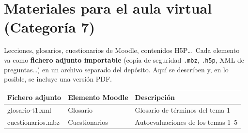 \chapter{Materiales para el aula virtual (Categoría 7)}

\begin{introcategoria}
Lecciones, glosarios, cuestionarios de Moodle, contenidos H5P\ldots\ Cada elemento va como
\textbf{fichero adjunto importable} (copia de seguridad \texttt{.mbz}, \texttt{.h5p}, XML
de preguntas\ldots) en un archivo separado del depósito. Aquí se describen y, en lo posible,
se incluye una versión PDF.
\end{introcategoria}

\begin{tabularx}{\textwidth}{@{}l l X@{}}
\toprule
\textbf{Fichero adjunto} & \textbf{Elemento Moodle} & \textbf{Descripción}\\
\midrule
glosario-t1.xml & Glosario & Glosario de términos del tema 1\\
cuestionarios.mbz & Cuestionarios & Autoevaluaciones de los temas 1--5\\
\bottomrule
\end{tabularx}

